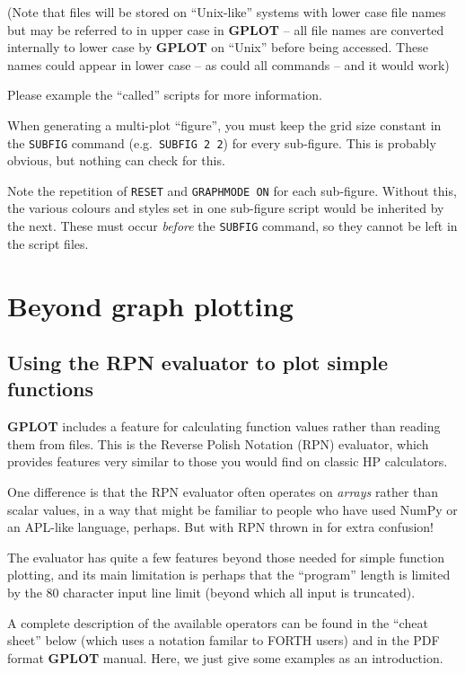 \documentclass[a4paper,twoside,11pt]{article}
\newcommand{\newpara}{\par\vspace{4mm}\noindent}
\begin{document}
\newpara
(Note that files will be stored on ``Unix-like'' systems with lower case
file names but may be referred to in upper case in \textbf{GPLOT} -- all file
names are converted internally to lower case by \textbf{GPLOT} on ``Unix'' before
being accessed. These names could appear in lower case -- as could all
commands -- and it would work)

\newpara
Please example the ``called'' scripts for more information.

\newpara
When generating a multi-plot ``figure'', you must keep the grid size
constant in the \texttt{SUBFIG} command (e.g.~\texttt{SUBFIG\ 2\ 2}) for
every sub-figure. This is probably obvious, but nothing can check for
this.

\newpara
Note the repetition of \texttt{RESET} and \texttt{GRAPHMODE\ ON} for
each sub-figure. Without this, the various colours and styles set in one
sub-figure script would be inherited by the next. These must occur
\emph{before} the \texttt{SUBFIG} command, so they cannot be left in the
script files.

\section{Beyond graph plotting}

\subsection{Using the RPN evaluator to plot simple functions}\label{using-the-rpn-evaluator-to-plot-simple-functions}

\newpara
\textbf{GPLOT} includes a feature for calculating function values rather than
reading them from files. This is the Reverse Polish Notation (RPN)
evaluator, which provides features very similar to those you would find
on classic HP calculators.

\newpara
One difference is that the RPN evaluator often operates on \emph{arrays}
rather than scalar values, in a way that might be familiar to people who
have used NumPy or an APL-like language, perhaps. But with RPN thrown in
for extra confusion!

\newpara
The evaluator has quite a few features beyond those needed for simple
function plotting, and its main limitation is perhaps that the
``program'' length is limited by the 80 character input line limit
(beyond which all input is truncated).

\newpara
A complete description of the available operators can be found in the
``cheat sheet'' below (which uses a notation familar to FORTH users) and
in the PDF format \textbf{GPLOT} manual. Here, we just give some examples as an
introduction.
\end{document}
